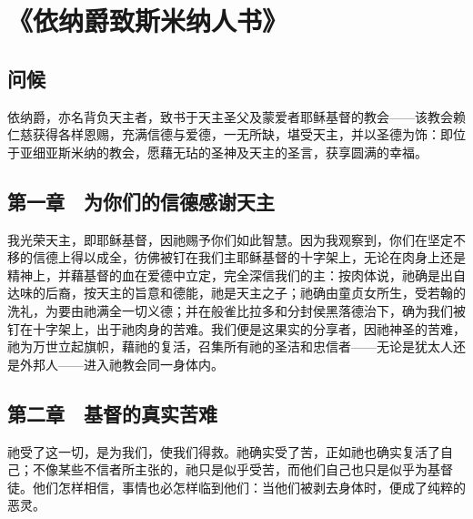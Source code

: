 
\chapter{《依纳爵致斯米纳人书》}



\section{问候}

依纳爵，亦名背负天主者，致书于天主圣父及蒙爱者耶稣基督的教会——该教会赖仁慈获得各样恩赐，充满信德与爱德，一无所缺，堪受天主，并以圣德为饰：即位于亚细亚斯米纳的教会，愿藉无玷的圣神及天主的圣言，获享圆满的幸福。\par


\section{第一章　为你们的信德感谢天主}

我光荣天主，即耶稣基督，因祂赐予你们如此智慧。因为我观察到，你们在坚定不移的信德上得以成全，彷佛被钉在我们主耶稣基督的十字架上，无论在肉身上还是精神上，并藉基督的血在爱德中立定，完全深信我们的主：按肉体说，祂确是出自达味的后裔，按天主的旨意和德能，祂是天主之子；祂确由童贞女所生，受若翰的洗礼，为要由祂满全一切义德；并在般雀比拉多和分封侯黑落德治下，确为我们被钉在十字架上，出于祂肉身的苦难。我们便是这果实的分享者，因祂神圣的苦难，祂为万世立起旗帜，藉祂的复活，召集所有祂的圣洁和忠信者——无论是犹太人还是外邦人——进入祂教会同一身体内。\par


\section{第二章　基督的真实苦难}

祂受了这一切，是为我们，使我们得救。祂确实受了苦，正如祂也确实复活了自己；不像某些不信者所主张的，祂只是似乎受苦，而他们自己也只是似乎为基督徒。他们怎样相信，事情也必怎样临到他们：当他们被剥去身体时，便成了纯粹的恶灵。\par

